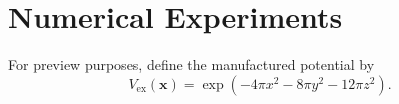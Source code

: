 \documentclass[a4paper,10pt]{article}
\begin{document}
\section{Numerical Experiments}
For preview purposes, define the manufactured potential by
\begin{equation}
\label{eq:manufactured_solution}
V_{\mathrm{ex}}(\mathbf x)=\exp(-4\pi x^2-8\pi y^2-12\pi z^2).
\end{equation}

\end{document}
